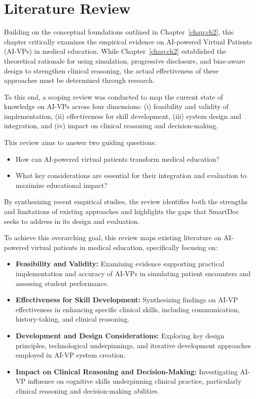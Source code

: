 \chapter{Literature Review} \label{chap:ch3}

Building on the conceptual foundations outlined in Chapter~\ref{chap:ch2},
this chapter critically examines the empirical evidence on AI-powered Virtual
Patients (AI-VPs) in medical education. While Chapter~\ref{chap:ch2} established
the theoretical rationale for using simulation, progressive disclosure, and
bias-aware design to strengthen clinical reasoning, the actual effectiveness
of these approaches must be determined through research. 

To this end, a scoping review was conducted to map the current state of knowledge
on AI-VPs across four dimensions: 
(i) feasibility and validity of implementation, 
(ii) effectiveness for skill development, 
(iii) system design and integration, and 
(iv) impact on clinical reasoning and decision-making. 

This review aims to answer two guiding questions:
\begin{itemize}
\item How can AI-powered virtual patients transform medical education?
\item What key considerations are essential for their integration and evaluation
to maximize educational impact?
\end{itemize}

By synthesizing recent empirical studies, the review identifies both the strengths
and limitations of existing approaches and highlights the gaps that SmartDoc seeks
to address in its design and evaluation.


To achieve this overarching goal, this review maps existing literature on AI-powered virtual patients in medical education, specifically focusing on:

\begin{itemize}
\item \textbf{Feasibility and Validity:} Examining evidence supporting practical implementation and accuracy of AI-VPs in simulating patient encounters and assessing student performance.
\item \textbf{Effectiveness for Skill Development:} Synthesizing findings on AI-VP effectiveness in enhancing specific clinical skills, including communication, history-taking, and clinical reasoning.
\item \textbf{Development and Design Considerations:} Exploring key design principles, technological underpinnings, and iterative development approaches employed in AI-VP system creation.
\item \textbf{Impact on Clinical Reasoning and Decision-Making:} Investigating AI-VP influence on cognitive skills underpinning clinical practice, particularly clinical reasoning and decision-making abilities.
\end{itemize}

